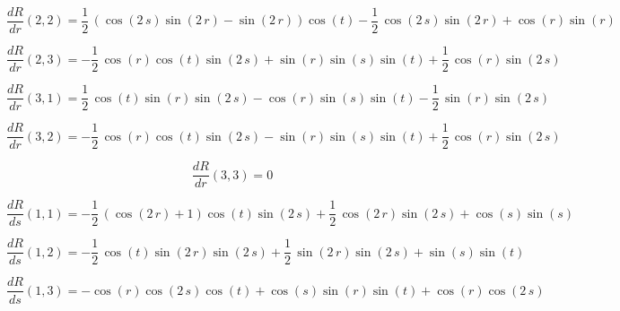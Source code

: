 \documentclass[a4paper,11pt]{article}
\begin{document}
\begin{equation}
\frac{dR}{dr}(2,2)=\frac{1}{2} \, {\left(\cos\left(2 \, s\right) \sin\left(2 \, r\right) - \sin\left(2 \, r\right)\right)} \cos\left(t\right) - \frac{1}{2} \, \cos\left(2 \, s\right) \sin\left(2 \, r\right) + \cos\left(r\right) \sin\left(r\right)
\end{equation}

\begin{equation}
\frac{dR}{dr}(2,3)=-\frac{1}{2} \, \cos\left(r\right) \cos\left(t\right) \sin\left(2 \, s\right) + \sin\left(r\right) \sin\left(s\right) \sin\left(t\right) + \frac{1}{2} \, \cos\left(r\right) \sin\left(2 \, s\right)
\end{equation}

\begin{equation}
\frac{dR}{dr}(3,1)=\frac{1}{2} \, \cos\left(t\right) \sin\left(r\right) \sin\left(2 \, s\right) - \cos\left(r\right) \sin\left(s\right) \sin\left(t\right) - \frac{1}{2} \, \sin\left(r\right) \sin\left(2 \, s\right)
\end{equation}

\begin{equation}
\frac{dR}{dr}(3,2)=-\frac{1}{2} \, \cos\left(r\right) \cos\left(t\right) \sin\left(2 \, s\right) - \sin\left(r\right) \sin\left(s\right) \sin\left(t\right) + \frac{1}{2} \, \cos\left(r\right) \sin\left(2 \, s\right)
\end{equation}

\begin{equation}
\frac{dR}{dr}(3,3)=0
\end{equation}

\begin{equation}
\frac{dR}{ds}(1,1)=-\frac{1}{2} \, {\left(\cos\left(2 \, r\right) + 1\right)} \cos\left(t\right) \sin\left(2 \, s\right) + \frac{1}{2} \, \cos\left(2 \, r\right) \sin\left(2 \, s\right) + \cos\left(s\right) \sin\left(s\right)
\end{equation}

\begin{equation}
\frac{dR}{ds}(1,2)=-\frac{1}{2} \, \cos\left(t\right) \sin\left(2 \, r\right) \sin\left(2 \, s\right) + \frac{1}{2} \, \sin\left(2 \, r\right) \sin\left(2 \, s\right) + \sin\left(s\right) \sin\left(t\right)
\end{equation}

\begin{equation}
\frac{dR}{ds}(1,3)=-\cos\left(r\right) \cos\left(2 \, s\right) \cos\left(t\right) + \cos\left(s\right) \sin\left(r\right) \sin\left(t\right) + \cos\left(r\right) \cos\left(2 \, s\right)
\end{equation}
\end{document}
